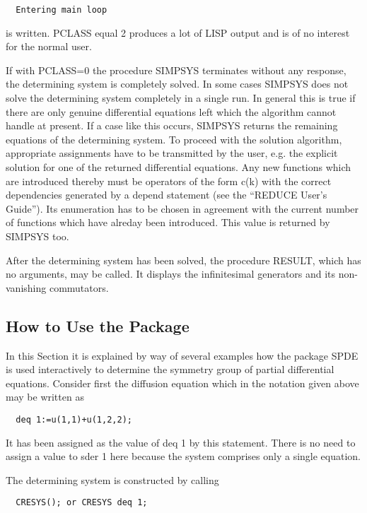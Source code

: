 \begin{verbatim}
  Entering main loop
\end{verbatim}

is written. PCLASS equal 2 produces a lot of LISP output and is of no
interest for the normal user.

If with PCLASS=0 the procedure SIMPSYS terminates without any
response, the determining system is completely solved.  In some cases
SIMPSYS does not solve the determining system completely in a single
run. In general this is true if there are only genuine differential
equations left which the algorithm cannot handle at present. If a case
like this occurs, SIMPSYS returns the remaining equations of the
determining system. To proceed with the solution algorithm,
appropriate assignments have to be transmitted by the user, e.g. the
explicit solution for one of the returned differential equations. Any
new functions which are introduced thereby must be operators of the
form c(k) with the correct dependencies generated by a depend
statement (see the ``REDUCE User's Guide''). Its enumeration has to be
chosen in agreement with the current number of functions which have
alreday been introduced.  This value is returned by SIMPSYS too.

After the determining system has been solved, the procedure RESULT,
which has no arguments, may be called. It displays the infinitesimal
generators and its non-vanishing commutators.


\subsection{How to Use the Package}

In this Section it is explained by way of several examples how the
package SPDE is used interactively to determine the symmetry group of
partial differential equations. Consider first the diffusion equation
which in the notation given above may be written as

\begin{verbatim}
  deq 1:=u(1,1)+u(1,2,2);
\end{verbatim}

It has been assigned as the value of deq 1 by this statement.  There
is no need to assign a value to sder 1 here because the system
comprises only a single equation.

The determining system is constructed by calling

\begin{verbatim}
  CRESYS(); or CRESYS deq 1;
\end{verbatim}

